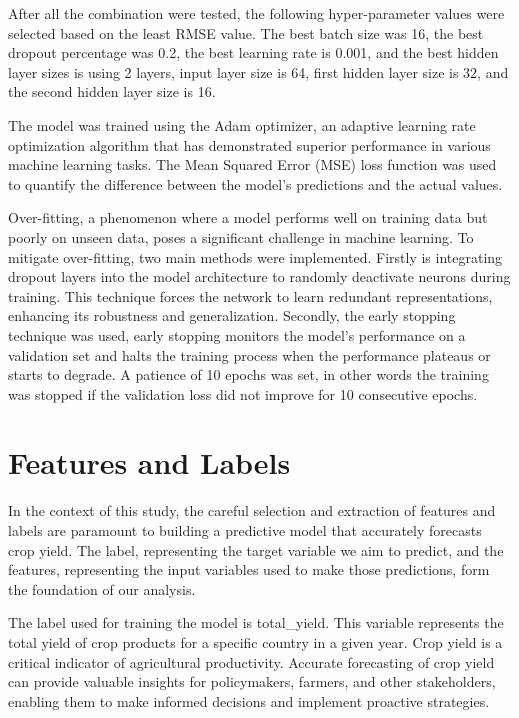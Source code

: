\documentclass[a4paper, 12pt]{article}
\begin{document}
After all the combination were tested, the following hyper-parameter values were selected based on the least RMSE value. The best batch size was 16, the best dropout percentage was 0.2, the best learning rate is 0.001, and the best hidden layer sizes is using 2 layers, input layer size is 64, first hidden layer size is 32, and the second hidden layer size is 16.

The model was trained using the Adam optimizer, an adaptive learning rate optimization algorithm that has demonstrated superior performance in various machine learning tasks. The Mean Squared Error (MSE) loss function was used to quantify the difference between the model's predictions and the actual values.

Over-fitting, a phenomenon where a model performs well on training data but poorly on unseen data, poses a significant challenge in machine learning. To mitigate over-fitting, two main methods were implemented. Firstly is integrating dropout layers into the model architecture to randomly deactivate neurons during training. This technique forces the network to learn redundant representations, enhancing its robustness and generalization. Secondly, the early stopping technique was used, early stopping monitors the model's performance on a validation set and halts the training process when the performance plateaus or starts to degrade. A patience of 10 epochs was set, in other words the training was stopped if the validation loss did not improve for 10 consecutive epochs.

\section{Features and Labels}
In the context of this study, the careful selection and extraction of features and labels are paramount to building a predictive model that accurately forecasts crop yield. The label, representing the target variable we aim to predict, and the features, representing the input variables used to make those predictions, form the foundation of our analysis.

The label used for training the model is total\_yield. This variable represents the total yield of crop products for a specific country in a given year. Crop yield is a critical indicator of agricultural productivity. Accurate forecasting of crop yield can provide valuable insights for policymakers, farmers, and other stakeholders, enabling them to make informed decisions and implement proactive strategies.
\end{document}
